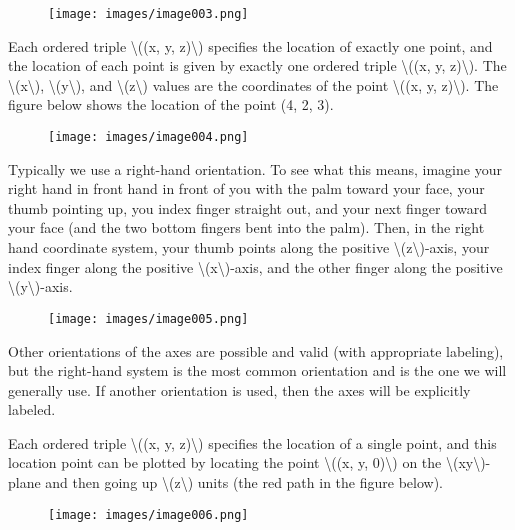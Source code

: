 \begin{figure}
\centering
\texttt{[image: images/image003.png]}
\caption{}
\end{figure}

Each ordered triple \textbackslash{}((x, y, z)\textbackslash{})
specifies the location of exactly one point, and the location of each
point is given by exactly one ordered triple \textbackslash{}((x, y,
z)\textbackslash{}). The \textbackslash{}(x\textbackslash{}),
\textbackslash{}(y\textbackslash{}), and
\textbackslash{}(z\textbackslash{}) values are the coordinates of the
point \textbackslash{}((x, y, z)\textbackslash{}). The figure below
shows the location of the point (4, 2, 3).

\begin{figure}
\centering
\texttt{[image: images/image004.png]}
\caption{}
\end{figure}

Typically we use a right-hand orientation. To see what this means,
imagine your right hand in front hand in front of you with the palm
toward your face, your thumb pointing up, you index finger straight out,
and your next finger toward your face (and the two bottom fingers bent
into the palm). Then, in the right hand coordinate system, your thumb
points along the positive \textbackslash{}(z\textbackslash{})-axis, your
index finger along the positive
\textbackslash{}(x\textbackslash{})-axis, and the other finger along the
positive \textbackslash{}(y\textbackslash{})-axis.

\begin{figure}
\centering
\texttt{[image: images/image005.png]}
\caption{}
\end{figure}

Other orientations of the axes are possible and valid (with appropriate
labeling), but the right-hand system is the most common orientation and
is the one we will generally use. If another orientation is used, then
the axes will be explicitly labeled.

Each ordered triple \textbackslash{}((x, y, z)\textbackslash{})
specifies the location of a single point, and this location point can be
plotted by locating the point \textbackslash{}((x, y,
0)\textbackslash{}) on the \textbackslash{}(xy\textbackslash{})-plane
and then going up \textbackslash{}(z\textbackslash{}) units (the red
path in the figure below).

\begin{figure}
\centering
\texttt{[image: images/image006.png]}
\caption{}
\end{figure}

